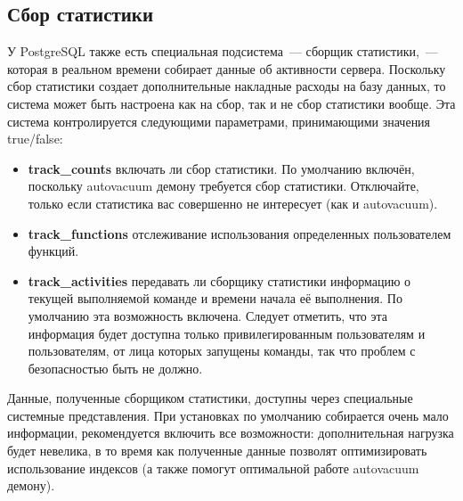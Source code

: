 \subsection{Сбор статистики}
У PostgreSQL также есть специальная подсистема~--- сборщик статистики,~--- которая в реальном времени собирает данные об
активности сервера. Поскольку сбор статистики создает дополнительные накладные расходы на базу данных, то система может быть настроена
как на сбор, так и не сбор статистики вообще.
Эта система контролируется следующими параметрами, принимающими значения true/false:
\begin{itemize}
\item \textbf{track\_counts} включать ли сбор статистики. По умолчанию включён, поскольку autovacuum демону требуется сбор статистики.
Отключайте, только если статистика вас совершенно не интересует (как и autovacuum).
\item \textbf{track\_functions} отслеживание использования определенных пользователем функций.
\item \textbf{track\_activities} передавать ли сборщику статистики информацию о текущей выполняемой команде и времени
начала её выполнения. По умолчанию эта возможность включена. Следует отметить, что эта информация будет доступна только
привилегированным пользователям и пользователям, от лица которых запущены команды, так что проблем с безопасностью быть не должно.
\end{itemize}

Данные, полученные сборщиком статистики, доступны через специальные системные представления. При установках по умолчанию собирается
очень мало информации, рекомендуется включить все возможности: дополнительная нагрузка будет невелика, в то время как полученные
данные позволят оптимизировать использование индексов (а также помогут оптимальной работе autovacuum демону).